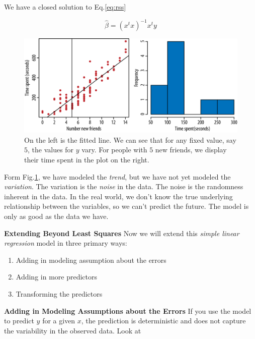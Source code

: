 We have a closed solution to Eq.\ref{eq:rss}

$$
    \hat{\beta}=\left(x^{t} x\right)^{-1} x^{t} y
$$

\begin{figure}[H]
    \centering
    \includegraphics[width=0.7\linewidth]{imgs/fundamental_algo/algo_5.png}
    \caption{On the left is the fitted line. We can see that for any fixed value, say $5$, the values for $y$ vary. For people with $5$ new friends, we display their time spent in the plot on the right.}
    \label{fig:algo_5}
\end{figure}

Form Fig.\ref{fig:algo_5}, we have modeled the \textit{trend}, but we have not yet modeled the \textit{variation}. The variation is the \textit{noise} in the data. The noise is the randomness inherent in the data. In the real world, we don't know the true underlying relationship between the variables, so we can't predict the future. The model is only as good as the data we have.

\textbf{Extending Beyond Least Squares} Now we will extend this \textit{simple linear regression} model in three primary ways:

\begin{enumerate}
    \item Adding in modeling assumption about the errors
    \item Adding in more predictors
    \item Transforming the predictors
\end{enumerate}

\textbf{Adding in Modeling Assumptions about the Errors} If you use the model to predict \(y\) for a given \(x\), the prediction is deterministic and does not capture the variability in the observed data. Look at